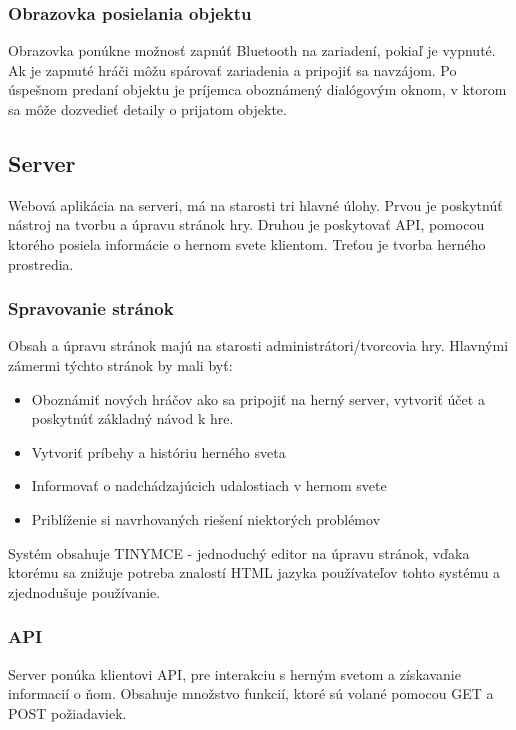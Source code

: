 \subsubsection{Obrazovka posielania objektu}
Obrazovka ponúkne možnosť zapnúť Bluetooth na zariadení, pokiaľ je vypnuté. Ak je zapnuté hráči môžu spárovať zariadenia a pripojiť sa navzájom. Po úspešnom predaní objektu je príjemca oboznámený dialógovým oknom, v ktorom sa môže dozvedieť detaily o prijatom objekte.


\subsection{Server}
Webová aplikácia na serveri, má na starosti tri hlavné úlohy. Prvou je poskytnúť nástroj na tvorbu a úpravu stránok hry. Druhou je poskytovať API, pomocou ktorého posiela informácie o hernom svete klientom. Treťou je tvorba herného prostredia.\ 

\subsubsection{Spravovanie stránok}
Obsah a úpravu stránok majú na starosti administrátori/tvorcovia hry. Hlavnými zámermi týchto stránok by mali byť:
 \begin{itemize}
  \item Oboznámiť nových hráčov ako sa pripojiť na herný server, vytvoriť účet a poskytnúť základný návod k hre.
  \item Vytvoriť príbehy a históriu herného sveta 
  \item Informovať o nadchádzajúcich udalostiach v hernom svete
  \item Priblíženie si navrhovaných riešení niektorých problémov
\end{itemize}
Systém obsahuje TINYMCE - jednoduchý editor na úpravu stránok, vďaka ktorému sa znižuje potreba znalostí HTML jazyka používateľov tohto systému a zjednodušuje používanie.

\subsubsection{API}
Server ponúka klientovi API, pre interakciu s herným svetom a získavanie informacií o ňom. Obsahuje množstvo funkcií, ktoré sú volané pomocou GET a POST požiadaviek.

